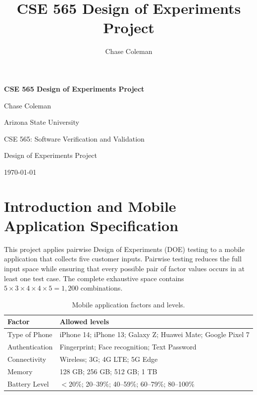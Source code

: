 \documentclass[11pt]{article}
\title{CSE 565 Design of Experiments Project}
\author{Chase Coleman}
\date{}
\begin{document}
\begin{titlepage}
    \centering
    \doublespacing
    \vspace*{1in}
    {\Large\textbf{CSE 565 Design of Experiments Project}\par}
    \vspace{0.5in}
    Chase Coleman\par
    Arizona State University\par
    CSE 565: Software Verification and Validation\par
    Design of Experiments Project\par
    \today\par
\end{titlepage}

\setcounter{page}{2}
\doublespacing

\section{Introduction and Mobile Application Specification}

This project applies pairwise Design of Experiments (DOE) testing to a mobile application that collects five customer inputs. Pairwise testing reduces the full input space while ensuring that every possible pair of factor values occurs in at least one test case. The complete exhaustive space contains $5 \times 3 \times 4 \times 4 \times 5 = 1{,}200$ combinations.

\begin{table}[H]
\centering
\caption{Mobile application factors and levels.}
\begin{tabular}{p{1.35in}p{4.65in}}
\toprule
\textbf{Factor} & \textbf{Allowed levels} \\
\midrule
Type of Phone & iPhone 14; iPhone 13; Galaxy Z; Huawei Mate; Google Pixel 7 \\
Authentication & Fingerprint; Face recognition; Text Password \\
Connectivity & Wireless; 3G; 4G LTE; 5G Edge \\
Memory & 128 GB; 256 GB; 512 GB; 1 TB \\
Battery Level & $< 20\%$; 20--39\%; 40--59\%; 60--79\%; 80--100\% \\
\bottomrule
\end{tabular}
\end{table}

\end{document}
